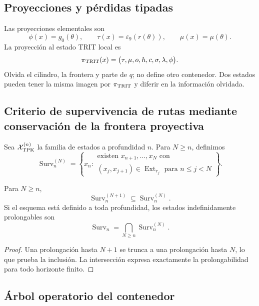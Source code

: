 {\subsection{Proyecciones y pérdidas tipadas}

Las proyecciones elementales son
\[
 \phi(x)=g_0(\theta),
 \qquad
 \tau(x)=\varepsilon_9(r(\theta)),
 \qquad
 \mu(x)=\mu(\theta).
\]
La proyección al estado TRIT local es
\[
 \pi_{\rm TRIT}(x)
 =\bigl(\tau,\mu,o,h,c,\sigma,\lambda,\phi\bigr).
\]
Olvida el cilindro, la frontera y parte de \(q\); no define otro contenedor.
Dos estados pueden tener la misma imagen por \(\pi_{\rm TRIT}\) y diferir
en la información olvidada.

\subsection{Criterio de supervivencia de rutas mediante conservación de la frontera proyectiva}

Sea \(\mathcal X_{\rm TPK}^{(n)}\) la familia de estados a profundidad
\(n\). Para \(N\geq n\), definimos
\[
 \operatorname{Surv}_n^{(N)}=
 \left\{x_n:
 \begin{array}{l}
 \text{existen }x_{n+1},\ldots,x_N\text{ con}\\
 (x_j,x_{j+1})\in\operatorname{Ext}_{r_j}
 \text{ para }n\leq j<N
 \end{array}\right\}.
\]

\begin{proposition}
\label{p12-83-c1-s3:prop:tpk-filtracion-supervivencia}
Para \(N\geq n\),
\[
 \operatorname{Surv}_n^{(N+1)}
 \subseteq
 \operatorname{Surv}_n^{(N)}.
\]
Si el esquema está definido a toda profundidad, los estados
indefinidamente prolongables son
\[
 \operatorname{Surv}_n
 =\bigcap_{N\geq n}\operatorname{Surv}_n^{(N)}.
\]
\end{proposition}

\begin{proof}
Una prolongación hasta \(N+1\) se trunca a una prolongación hasta \(N\),
lo que prueba la inclusión. La intersección expresa exactamente la
prolongabilidad para todo horizonte finito.
\end{proof}

\subsection{Árbol operatorio del contenedor}

}
